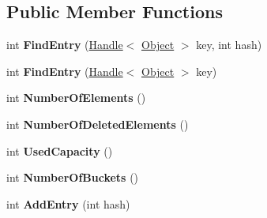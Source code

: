 \subsection*{Public Member Functions}
\begin{DoxyCompactItemize}
\item 
\hypertarget{classv8_1_1internal_1_1_ordered_hash_table_a80ec506fb0f246509b71d96251e0b09a}{}int {\bfseries Find\+Entry} (\hyperlink{classv8_1_1internal_1_1_handle}{Handle}$<$ \hyperlink{classv8_1_1internal_1_1_object}{Object} $>$ key, int hash)\label{classv8_1_1internal_1_1_ordered_hash_table_a80ec506fb0f246509b71d96251e0b09a}

\item 
\hypertarget{classv8_1_1internal_1_1_ordered_hash_table_a59f35b7a701d3db320e23b75c9bbad21}{}int {\bfseries Find\+Entry} (\hyperlink{classv8_1_1internal_1_1_handle}{Handle}$<$ \hyperlink{classv8_1_1internal_1_1_object}{Object} $>$ key)\label{classv8_1_1internal_1_1_ordered_hash_table_a59f35b7a701d3db320e23b75c9bbad21}

\item 
\hypertarget{classv8_1_1internal_1_1_ordered_hash_table_ab5f072a8f192a88a9ae312756d44163f}{}int {\bfseries Number\+Of\+Elements} ()\label{classv8_1_1internal_1_1_ordered_hash_table_ab5f072a8f192a88a9ae312756d44163f}

\item 
\hypertarget{classv8_1_1internal_1_1_ordered_hash_table_a5e9e547c72e71a48ab0c333c5f9ccbc1}{}int {\bfseries Number\+Of\+Deleted\+Elements} ()\label{classv8_1_1internal_1_1_ordered_hash_table_a5e9e547c72e71a48ab0c333c5f9ccbc1}

\item 
\hypertarget{classv8_1_1internal_1_1_ordered_hash_table_aadee5008eee16bf6ad0df51900e1769d}{}int {\bfseries Used\+Capacity} ()\label{classv8_1_1internal_1_1_ordered_hash_table_aadee5008eee16bf6ad0df51900e1769d}

\item 
\hypertarget{classv8_1_1internal_1_1_ordered_hash_table_aff25ae9301597420774590c73d053080}{}int {\bfseries Number\+Of\+Buckets} ()\label{classv8_1_1internal_1_1_ordered_hash_table_aff25ae9301597420774590c73d053080}

\item 
\hypertarget{classv8_1_1internal_1_1_ordered_hash_table_a8e2391578fe5ccf8b231f569e7c37e5b}{}int {\bfseries Add\+Entry} (int hash)\label{classv8_1_1internal_1_1_ordered_hash_table_a8e2391578fe5ccf8b231f569e7c37e5b}


\end{DoxyCompactItemize}
